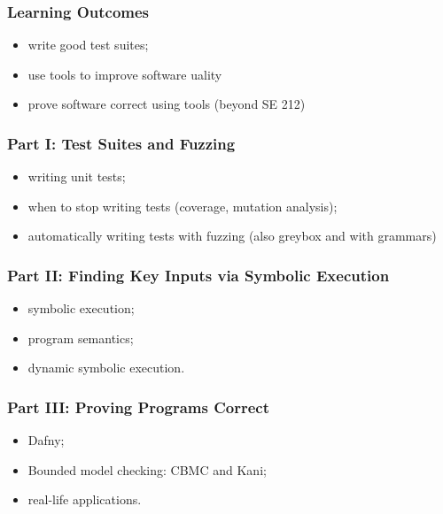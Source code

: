 \documentclass{beamer}
\newenvironment{changemargin}[1]{%
  \begin{list}{}{%
    \setlength{\topsep}{0pt}%
    \setlength{\leftmargin}{#1}%
    \setlength{\rightmargin}{1em}
    \setlength{\listparindent}{\parindent}%
    \setlength{\itemindent}{\parindent}%
    \setlength{\parsep}{\parskip}%
  }%
  \item[]}{\end{list}}
\begin{document}
\begin{frame}
  \frametitle{Learning Outcomes}

  \Large
  \begin{changemargin}{2em}
    \begin{itemize}
    \item write good test suites;
    \item use tools to improve software uality
      \item prove software correct using tools (beyond SE 212)
        \end{itemize}
  \end{changemargin}
\end{frame}


\begin{frame}
\frametitle{Part I: Test Suites and Fuzzing}
\begin{changemargin}{2em}
\Large
\begin{itemize}
\item writing unit tests;
\item when to stop writing tests (coverage, mutation analysis);
\item automatically writing tests with fuzzing (also greybox and with grammars)
\end{itemize}
\end{changemargin}
\end{frame}

\begin{frame}
\frametitle{Part II: Finding Key Inputs via Symbolic Execution}
\begin{changemargin}{2em}
\Large
\begin{itemize}
\item symbolic execution;
\item program semantics;
\item dynamic symbolic execution.
\end{itemize}
\end{changemargin}
\end{frame}

\begin{frame}
\frametitle{Part III: Proving Programs Correct}
\begin{changemargin}{2em}
\Large
\begin{itemize}
\item Dafny;
\item Bounded model checking: CBMC and Kani;
\item real-life applications.
\end{itemize}
\end{changemargin}
\end{frame}
\end{document}
